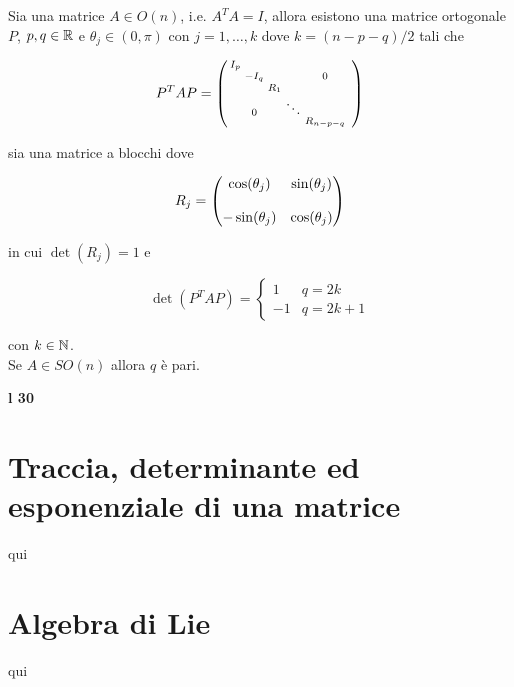 \begin{theorem}
	Sia una matrice $ A \in O(n) $, i.e. $ A^{T} A = I $, allora esistono una matrice ortogonale $ P $, $ p,q \in \mathbb{R} $ e $ \theta_{j} \in (0,\pi) $ con $ j=1,\dots,k $ dove $ k = (n-p-q)/2 $ tali che
	
	\begin{equation}
		P^{T} A P = %
		\smqty(\dmat{ I_{p} & & & & & \\ & - I_{q} & & & 0 & \\ & & R_{1} & & & \\ & 0 & & \ddots & \\ & & & & R_{n-p-q} })
	\end{equation}

	sia una matrice a blocchi dove
	
	\begin{equation}
		R_{j} = \mqty(\dmat{ \cos(\theta_{j}) & \sin(\theta_{j}) \\\\ - \sin(\theta_{j}) & \cos(\theta_{j}) })
	\end{equation}

	in cui $ \det(R_{j}) = 1 $ e
	
	\begin{equation}
		\det(P^{T} A P) = %
		\begin{cases}
			1 & q = 2 k\\
			- 1 & q = 2 k + 1
		\end{cases}
	\end{equation}

	con $ k \in \mathbb{N} $.\\
	Se $ A \in SO(n) $ allora $ q $ è pari.
\end{theorem}

\textbf{l 30}

\section{Traccia, determinante ed esponenziale di una matrice}

qui

\section{Algebra di Lie}

qui